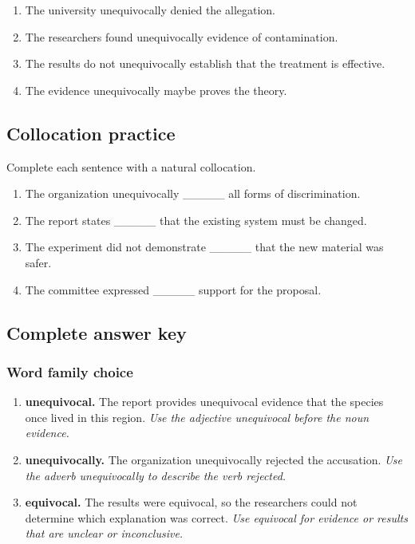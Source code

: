 \documentclass[11pt]{article}
\begin{document}
\begin{enumerate}
  \item The university unequivocally denied the allegation.
  \item The researchers found unequivocally evidence of contamination.
  \item The results do not unequivocally establish that the treatment is effective.
  \item The evidence unequivocally maybe proves the theory.
\end{enumerate}

\subsection{Collocation practice}
Complete each sentence with a natural collocation.

\begin{enumerate}
  \item The organization unequivocally \_\_\_\_\_ all forms of discrimination.
  \item The report states \_\_\_\_\_ that the existing system must be changed.
  \item The experiment did not demonstrate \_\_\_\_\_ that the new material was safer.
  \item The committee expressed \_\_\_\_\_ support for the proposal.
\end{enumerate}

\subsection{Complete answer key}
\subsubsection{Word family choice}
\begin{enumerate}
  \item \textbf{unequivocal.} The report provides unequivocal evidence that the species once lived in this region. \emph{Use the adjective unequivocal before the noun evidence.}
  \item \textbf{unequivocally.} The organization unequivocally rejected the accusation. \emph{Use the adverb unequivocally to describe the verb rejected.}
  \item \textbf{equivocal.} The results were equivocal, so the researchers could not determine which explanation was correct. \emph{Use equivocal for evidence or results that are unclear or inconclusive.}
\end{enumerate}
\end{document}
